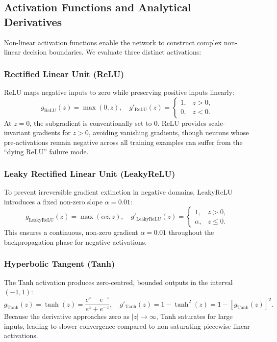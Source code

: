 \documentclass[11pt,a4paper]{article}
\begin{document}
\subsection{Activation Functions and Analytical Derivatives}
Non-linear activation functions enable the network to construct complex non-linear decision boundaries. We evaluate three distinct activations:

\subsubsection{Rectified Linear Unit (ReLU)}
ReLU maps negative inputs to zero while preserving positive inputs linearly:
\begin{equation}
    g_{\text{ReLU}}(z) = \max(0, z), \quad 
    g'_{\text{ReLU}}(z) = \begin{cases} 
        1, & z > 0, \\ 
        0, & z < 0. 
    \end{cases}
\end{equation}
At $z=0$, the subgradient is conventionally set to 0. ReLU provides scale-invariant gradients for $z>0$, avoiding vanishing gradients, though neurons whose pre-activations remain negative across all training examples can suffer from the ``dying ReLU'' failure mode.

\subsubsection{Leaky Rectified Linear Unit (LeakyReLU)}
To prevent irreversible gradient extinction in negative domains, LeakyReLU introduces a fixed non-zero slope $\alpha = 0.01$:
\begin{equation}
    g_{\text{LeakyReLU}}(z) = \max(\alpha z, z), \quad 
    g'_{\text{LeakyReLU}}(z) = \begin{cases} 
        1, & z > 0, \\ 
        \alpha, & z \leq 0. 
    \end{cases}
\end{equation}
This ensures a continuous, non-zero gradient $\alpha = 0.01$ throughout the backpropagation phase for negative activations.

\subsubsection{Hyperbolic Tangent (Tanh)}
The Tanh activation produces zero-centred, bounded outputs in the interval $(-1, 1)$:
\begin{equation}
    g_{\text{Tanh}}(z) = \tanh(z) = \frac{e^z - e^{-z}}{e^z + e^{-z}}, \quad 
    g'_{\text{Tanh}}(z) = 1 - \tanh^2(z) = 1 - [g_{\text{Tanh}}(z)]^2.
\end{equation}
Because the derivative approaches zero as $|z| \to \infty$, Tanh saturates for large inputs, leading to slower convergence compared to non-saturating piecewise linear activations.
\end{document}
